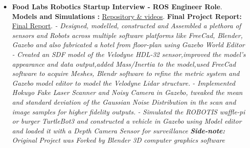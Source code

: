 \documentclass[a4paper,12pt]{article}
\begin{document}
\begin{itemize}
    \item{\textbf{\large{Food Labs Robotics Startup Interview - ROS Engineer Role}}.
          \newline
          \textbf{ Models and Simulations :} \href{https://github.com/teetangh/Kaustav-ROS-Workspace}{Repository \& videos}.
          \textbf{  Final Project Report:} \href{https://github.com/teetangh/Kaustav-ROS-Workspace/blob/master/Resources/Final%20Report.pdf}{Final Report}.
              \newline
              \textit{- Designed, modelled, constructed and
                  Assembled a plethora of sensors and Robots across multiple software platforms like
                  FreeCad, Blender, Gazebo and also fabricated a hotel from floor-plan using Gazebo World Editor}
              \newline
              \textit{- Created an SDF model of the Velodyne HDL-32 sensor,improved the model's appearance and data output,added Mass/Inertia to the model,used FreeCad software to acquire Meshes, Blendr software to refine the metric system and Gazebo model editor to model the Velodyne Lidar structure.}
              \newline
              \textit{- Implemented Hokuyo Fake Laser Scanner and Noisy Camera in Gazebo, tweaked the mean and standard deviation of the Gaussian Noise Distribution in the scan and image samples for higher fidelity outputs.}
              \newline
              \textit{- Simulated the ROBOTIS waffle-pi or burger TurtleBot3 and constructed a vehicle in Gazebo using Model editor and loaded it with a Depth Camera Sensor for surveillance}
              \newline
              \textit{\textbf{Side-note:} Original Project was Forked by Blender 3D computer graphics software }}
          \newline


\end{itemize}
\end{document}
